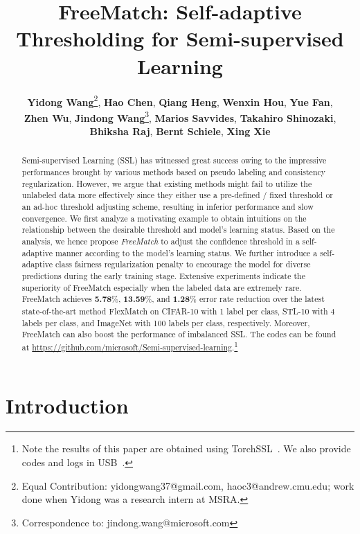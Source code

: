 \documentclass{article} \usepackage{iclr2023_conference,times}
\title{FreeMatch: Self-adaptive Thresholding for Semi-supervised Learning}
\author{
\textbf{Yidong Wang}\thanks{\scriptsize{Equal Contribution: yidongwang37@gmail.com, haoc3@andrew.cmu.edu; work done when Yidong was a research intern at MSRA.}}, \textbf{Hao Chen}, \textbf{Qiang Heng}, \textbf{Wenxin Hou}, \textbf{Yue Fan}, \\ \textbf{Zhen Wu}, \textbf{Jindong Wang}\thanks{\scriptsize{Correspondence to: jindong.wang@microsoft.com}}, \textbf{Marios Savvides}, \textbf{Takahiro Shinozaki}, \\ \textbf{Bhiksha Raj}, \textbf{Bernt Schiele}, \textbf{Xing Xie}
}
\affil{\small{Microsoft Research Asia, Tokyo Institute of Technology, Carnegie Mellon University, \\ North Carolina State University, Microsoft STCA,\\ Max-Planck-Institut für Informatik, Nanjing University}}
\theoremstyle{plain}
\theoremstyle{definition}
\theoremstyle{remark}
\begin{document}
\maketitle

\begin{abstract}
    Semi-supervised Learning (SSL) has witnessed great success owing to the impressive performances brought by various methods based on pseudo labeling and consistency regularization.
However, we argue that existing methods might fail to utilize the unlabeled data more effectively since they either use a pre-defined / fixed threshold or an ad-hoc threshold adjusting scheme, resulting in inferior performance and slow convergence. We first analyze a motivating example to obtain intuitions on the relationship between the desirable threshold and model's learning status. Based on the analysis, we hence propose \emph{FreeMatch} to adjust the confidence threshold in a self-adaptive manner according to the model's learning status. We further introduce a self-adaptive class fairness regularization penalty to encourage the model for diverse predictions during the early training stage. Extensive experiments indicate the superiority of FreeMatch especially when the labeled data are extremely rare. FreeMatch achieves \textbf{5.78}\%, \textbf{13.59}\%, and \textbf{1.28}\% error rate reduction over the latest state-of-the-art method FlexMatch on CIFAR-10 with 1 label per class, STL-10 with 4 labels per class, and ImageNet with 100 labels per class, respectively. Moreover, FreeMatch can also boost the performance of imbalanced SSL. The codes can be found at \url{https://github.com/microsoft/Semi-supervised-learning}.\footnote{Note the results of this paper are obtained using TorchSSL~\citep{zhang2021flexmatch}. We also provide codes and logs in USB~\citep{wang2022usb}.}
\end{abstract}


\section{Introduction}
\end{document}
